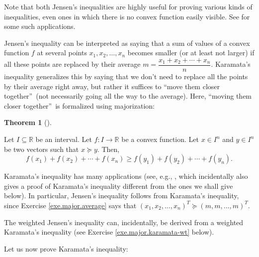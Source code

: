 \documentclass[numbers=enddot,12pt,final,onecolumn,notitlepage]{scrartcl}%
\numberwithin{exer}{subsection}
\theoremstyle{definition}
\newtheorem{theo}{Theorem}[subsection]
\newenvironment{theorem}[1][]
{\begin{theo}[#1]\begin{leftbar}}
{\end{leftbar}\end{theo}}
\begin{document}
Note that both Jensen's inequalities are highly useful for proving various
kinds of inequalities, even ones in which there is no convex function easily
visible. See \cite[Chapter 4]{Hung07} for some such applications.

Jensen's inequality can be interpreted as saying that a sum of values of a
convex function $f$ at several points $x_{1},x_{2},\ldots,x_{n}$ becomes
smaller (or at least not larger) if all these points are replaced by their
average $m=\dfrac{x_{1}+x_{2}+\cdots+x_{n}}{n}$. Karamata's inequality
generalizes this by saying that we don't need to replace all the points by
their average right away, but rather it suffices to \textquotedblleft move
them closer together\textquotedblright\ (not necessarily going all the way to
the average). Here, \textquotedblleft moving them closer
together\textquotedblright\ is formalized using majorization:

\begin{theorem}
[Karamata's inequality]\label{thm.major.karamata}Let $I\subseteq\mathbb{R}$ be
an interval. Let $f:I\rightarrow\mathbb{R}$ be a convex function. Let $x\in
I^{n}$ and $y\in I^{n}$ be two vectors such that $x\succcurlyeq y$. Then,%
\[
f\left(  x_{1}\right)  +f\left(  x_{2}\right)  +\cdots+f\left(  x_{n}\right)
\geq f\left(  y_{1}\right)  +f\left(  y_{2}\right)  +\cdots+f\left(
y_{n}\right)  .
\]

\end{theorem}

Karamata's inequality has many applications (see, e.g., \cite[\S 2]{KDLM05},
which incidentally also gives a proof of Karamata's inequality different from
the ones we shall give below). In particular, Jensen's inequality follows from
Karamata's inequality, since Exercise \ref{exe.major.average} says that
$\left(  x_{1},x_{2},\ldots,x_{n}\right)  ^{T}\succcurlyeq\left(
m,m,\ldots,m\right)  ^{T}$.

The weighted Jensen's inequality can, incidentally, be derived from a weighted
Karamata's inequality (see Exercise \ref{exe.major.karamata-wt} below).

Let us now prove Karamata's inequality:
\end{document}
